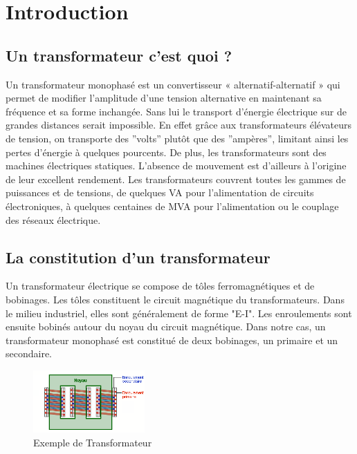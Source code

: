 \section{Introduction}


\subsection{Un transformateur c'est quoi ? }
	
	Un transformateur monophasé est un convertisseur « alternatif-alternatif » qui permet de modifier l'amplitude d'une tension alternative en maintenant sa fréquence et sa forme inchangée. Sans lui le transport d'énergie électrique sur de grandes distances serait impossible. En effet grâce aux transformateurs élévateurs de tension, on transporte des ''volts'' plutôt que des ''ampères'', limitant ainsi les pertes d'énergie à quelques pourcents. De plus, les transformateurs sont des machines électriques statiques. L'absence de mouvement est d'ailleurs à l'origine de leur excellent rendement. Les transformateurs couvrent toutes les gammes de puissances et de tensions, de quelques VA pour l'alimentation de circuits électroniques, à quelques centaines de MVA pour l'alimentation ou le couplage des réseaux électrique. 

\subsection{La constitution d'un transformateur}
	
	Un transformateur électrique se compose de tôles ferromagnétiques et de bobinages. Les tôles constituent le circuit magnétique du transformateurs. Dans le milieu industriel, elles sont généralement de forme "E-I". 
	Les enroulements sont ensuite bobinés autour du noyau du circuit magnétique. Dans notre cas, un transformateur monophasé est constitué de deux bobinages, un primaire et un secondaire. 

\begin{figure}[ht]
	\begin{center}
	\includegraphics[width=0.38\textwidth]{images/transfo}
	\caption{Exemple de Transformateur }\label{img:transfo}
	\end{center}
\end{figure}
\FloatBarrier 
 	
